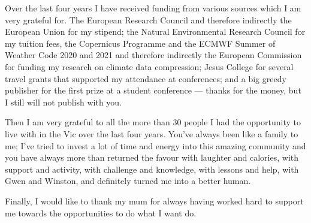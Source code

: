\begin{acknowledgements}
Over the last four years I have received funding from various sources which I am very grateful for. The European
Research Council and therefore indirectly the European Union for my stipend; the Natural Environmental Research
Council for my tuition fees, the Copernicus Programme and the ECMWF Summer of Weather Code 2020 and 2021
and therefore indirectly the European Commission for funding my research on climate data compression; Jesus
College for several travel grants that supported my attendance at conferences; and a big greedy publisher for the first
prize at a student conference --- thanks for the money, but I still will not publish with you.

Then I am very grateful to all the more than 30 people I had the opportunity to live with in the Vic over the last four years.
You've always been like a family to me; I've tried to invest a lot of time and energy into this amazing community and you
have always more than returned the favour with laughter and calories, with support and activity, with challenge and
knowledge, with lessons and help, with Gwen and Winston, and definitely turned me into a better human.

Finally, I would like to thank my mum for always having worked hard to support me towards the opportunities to do what I want do.
 
\end{acknowledgements}
